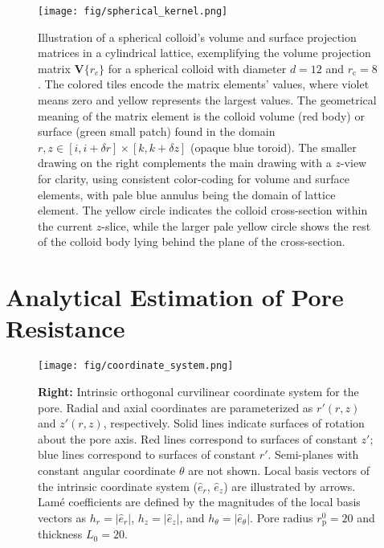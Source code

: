 \documentclass[10pt, a4paper]{article}
\begin{document}
\begin{multicols}{2}
\begin{figure}[H]
    \centering
    \texttt{[image: fig/spherical\_kernel.png]}
    \caption{
        Illustration of a spherical colloid's volume and surface projection matrices in a cylindrical lattice, exemplifying the volume projection matrix $\bm{V}\{r_c\}$ for a spherical colloid with diameter $d = 12$ and $r_{\text{c}}= 8$.
        The colored tiles encode the matrix elements' values, where violet means zero and yellow represents the largest values.
        The geometrical meaning of the matrix element is the colloid volume (red body) or surface (green small patch) found in the domain $r,z \in [i, i + \delta r] \times [k, k + \delta z]$ (opaque blue toroid).
        The smaller drawing on the right complements the main drawing with a $z$-view for clarity, using consistent color-coding for volume and surface elements, with pale blue annulus being the domain of lattice element.
        The yellow circle indicates the colloid cross-section within the current $z$-slice, while the larger pale yellow circle shows the rest of the colloid body lying behind the plane of the cross-section.
    }
    \label{fig:spherical_kernel}
\end{figure}

\end{multicols}


\section{Analytical Estimation of Pore Resistance}
\begin{figure*}[h]
    \centering
    \texttt{[image: fig/coordinate\_system.png]}
    \caption{%
        \textbf{Left:}
        Steady-state solution of the diffusion equation for a point-like particle diffusing through an empty cylindrical pore of finite thickness.
        Iso-concentration surfaces, $c = \text{const}$, are represented by contour lines with labeled concentration values.
        Blue and red axes indicate radial and axial coordinates, respectively.
        Pore radius $r_{\text{p}}^{0} = 20$ and thickness $L_{0} = 20$.
    }
    \label{fig:empty_pore_solution}
    \caption{
        \textbf{Right:}
        Intrinsic orthogonal curvilinear coordinate system for the pore.
        Radial and axial coordinates are parameterized as $r'(r,z)$ and $z'(r,z)$, respectively.
        Solid lines indicate surfaces of rotation about the pore axis.
        Red lines correspond to surfaces of constant $z'$; blue lines correspond to surfaces of constant $r'$.
        Semi-planes with constant angular coordinate $\theta$ are not shown.
        Local basis vectors of the intrinsic coordinate system ($\hat{e}_r$, $\hat{e}_z$) are illustrated by arrows.
        Lamé coefficients are defined by the magnitudes of the local basis vectors as $h_r = |\hat{e}_r|$, $h_z = |\hat{e}_z|$, and $h_{\theta} = |\hat{e}_{\theta}|$.
        Pore radius $r_{\text{p}}^{0} = 20$ and thickness $L_{0} = 20$.
        }
    \label{fig:coordinate_system}
\end{figure*}
\end{document}
